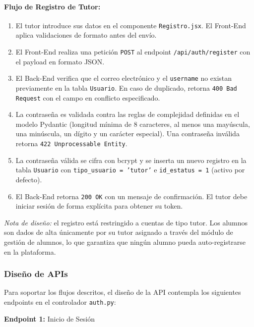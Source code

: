 \paragraph{Flujo de Registro de Tutor:}
\begin{enumerate}
    \item El tutor introduce sus datos en el componente
    \texttt{Registro.jsx}. El Front-End aplica validaciones de formato
    antes del envío.
    \item El Front-End realiza una petición \texttt{POST} al endpoint
    \texttt{/api/auth/register} con el payload en formato JSON.
    \item El Back-End verifica que el correo electrónico y el
    \texttt{username} no existan previamente en la tabla
    \texttt{Usuario}. En caso de duplicado, retorna \texttt{400 Bad Request}
    con el campo en conflicto especificado.
    \item La contraseña es validada contra las reglas de complejidad
    definidas en el modelo Pydantic (longitud mínima de 8 caracteres,
    al menos una mayúscula, una minúscula, un dígito y un carácter
    especial). Una contraseña inválida retorna \texttt{422 Unprocessable
    Entity}.
    \item La contraseña válida se cifra con bcrypt y se inserta un nuevo
    registro en la tabla \texttt{Usuario} con \texttt{tipo\_usuario =
    'tutor'} e \texttt{id\_estatus = 1} (activo por defecto).
    \item El Back-End retorna \texttt{200 OK} con un mensaje de
    confirmación. El tutor debe iniciar sesión de forma explícita
    para obtener su token.
\end{enumerate}
 
\noindent \textit{Nota de diseño:} el registro está restringido a cuentas
de tipo tutor. Los alumnos son dados de alta únicamente por su tutor
asignado a través del módulo de gestión de alumnos, lo que garantiza que
ningún alumno pueda auto-registrarse en la plataforma.
 
\subsubsection{Diseño de APIs}
 
Para soportar los flujos descritos, el diseño de la API contempla los
siguientes endpoints en el controlador \texttt{auth.py}:
 
\textbf{Endpoint 1:} Inicio de Sesión
 
